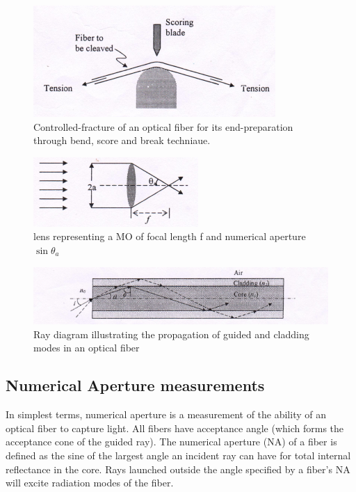 \documentclass[%
 reprint,
nofootinbib,
 amsmath,amssymb,
 aps,
]{revtex4-2}
\begin{document}
\begin{figure}
	\centering
	\includegraphics[scale=0.65]{cleave}
	\caption{Controlled-fracture of an optical fiber for its end-preparation through bend, score and
		break techniaue.}
	\label{fig:cleave}
\end{figure}

\begin{figure}
	\centering
	\includegraphics[scale = 0.65]{MO}
	\caption{lens representing a MO of focal length f and numerical aperture $ \sin \theta_a $}
	\label{fig:mo}
\end{figure}


\begin{figure}
	\centering
	\includegraphics[scale=0.55]{coupling}
	\caption{Ray diagram illustrating the propagation of guided and cladding modes in an optical fiber}
	\label{fig:coupling}
\end{figure}

\subsection{Numerical Aperture measurements}
In simplest terms, numerical aperture is a measurement of the ability of an optical fiber to capture light. All fibers have acceptance angle (which forms the acceptance cone of the guided ray). The numerical aperture (NA) of a fiber is defined as the
sine of the largest angle an incident ray can have for total
internal reflectance in the core. Rays launched outside the
angle specified by a fiber’s NA will excite radiation modes of
the fiber.
\end{document}

